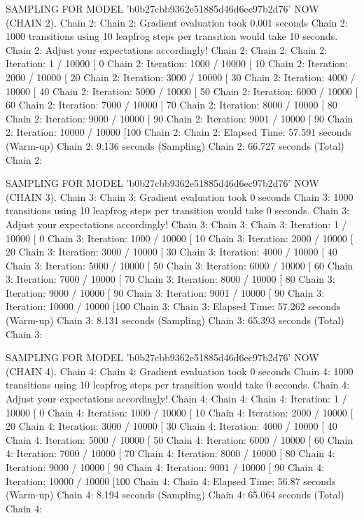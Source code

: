 \documentclass[
]{jss}
\begin{document}
\begin{CodeChunk}
\begin{CodeOutput}
SAMPLING FOR MODEL 'b0b27cbb9362e51885d46d6ec97b2d76' NOW (CHAIN 2).
Chain 2: 
Chain 2: Gradient evaluation took 0.001 seconds
Chain 2: 1000 transitions using 10 leapfrog steps per transition would take 10 seconds.
Chain 2: Adjust your expectations accordingly!
Chain 2: 
Chain 2: 
Chain 2: Iteration:    1 / 10000 [  0%
Chain 2: Iteration: 1000 / 10000 [ 10%
Chain 2: Iteration: 2000 / 10000 [ 20%
Chain 2: Iteration: 3000 / 10000 [ 30%
Chain 2: Iteration: 4000 / 10000 [ 40%
Chain 2: Iteration: 5000 / 10000 [ 50%
Chain 2: Iteration: 6000 / 10000 [ 60%
Chain 2: Iteration: 7000 / 10000 [ 70%
Chain 2: Iteration: 8000 / 10000 [ 80%
Chain 2: Iteration: 9000 / 10000 [ 90%
Chain 2: Iteration: 9001 / 10000 [ 90%
Chain 2: Iteration: 10000 / 10000 [100%
Chain 2: 
Chain 2:  Elapsed Time: 57.591 seconds (Warm-up)
Chain 2:                9.136 seconds (Sampling)
Chain 2:                66.727 seconds (Total)
Chain 2: 

SAMPLING FOR MODEL 'b0b27cbb9362e51885d46d6ec97b2d76' NOW (CHAIN 3).
Chain 3: 
Chain 3: Gradient evaluation took 0 seconds
Chain 3: 1000 transitions using 10 leapfrog steps per transition would take 0 seconds.
Chain 3: Adjust your expectations accordingly!
Chain 3: 
Chain 3: 
Chain 3: Iteration:    1 / 10000 [  0%
Chain 3: Iteration: 1000 / 10000 [ 10%
Chain 3: Iteration: 2000 / 10000 [ 20%
Chain 3: Iteration: 3000 / 10000 [ 30%
Chain 3: Iteration: 4000 / 10000 [ 40%
Chain 3: Iteration: 5000 / 10000 [ 50%
Chain 3: Iteration: 6000 / 10000 [ 60%
Chain 3: Iteration: 7000 / 10000 [ 70%
Chain 3: Iteration: 8000 / 10000 [ 80%
Chain 3: Iteration: 9000 / 10000 [ 90%
Chain 3: Iteration: 9001 / 10000 [ 90%
Chain 3: Iteration: 10000 / 10000 [100%
Chain 3: 
Chain 3:  Elapsed Time: 57.262 seconds (Warm-up)
Chain 3:                8.131 seconds (Sampling)
Chain 3:                65.393 seconds (Total)
Chain 3: 

SAMPLING FOR MODEL 'b0b27cbb9362e51885d46d6ec97b2d76' NOW (CHAIN 4).
Chain 4: 
Chain 4: Gradient evaluation took 0 seconds
Chain 4: 1000 transitions using 10 leapfrog steps per transition would take 0 seconds.
Chain 4: Adjust your expectations accordingly!
Chain 4: 
Chain 4: 
Chain 4: Iteration:    1 / 10000 [  0%
Chain 4: Iteration: 1000 / 10000 [ 10%
Chain 4: Iteration: 2000 / 10000 [ 20%
Chain 4: Iteration: 3000 / 10000 [ 30%
Chain 4: Iteration: 4000 / 10000 [ 40%
Chain 4: Iteration: 5000 / 10000 [ 50%
Chain 4: Iteration: 6000 / 10000 [ 60%
Chain 4: Iteration: 7000 / 10000 [ 70%
Chain 4: Iteration: 8000 / 10000 [ 80%
Chain 4: Iteration: 9000 / 10000 [ 90%
Chain 4: Iteration: 9001 / 10000 [ 90%
Chain 4: Iteration: 10000 / 10000 [100%
Chain 4: 
Chain 4:  Elapsed Time: 56.87 seconds (Warm-up)
Chain 4:                8.194 seconds (Sampling)
Chain 4:                65.064 seconds (Total)
Chain 4: 


\end{CodeOutput}
\end{CodeChunk}
\end{document}
